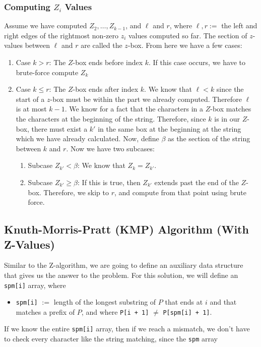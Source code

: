 \documentclass[10pt]{article}
\begin{document}
\subsubsection*{Computing $Z_i$ Values}
Assume we have computed $Z_2, \dots, Z_{k - 1}$, and $\ell$ and $r$, where $\ell, r :=$ the left and right edges of the rightmost non-zero $z_i$ values computed so far.  The section of $z$-values between $\ell$ and $r$ are called the $z$-box.  From here we have a few cases:
\begin{enumerate}
    \item Case $k > r$:  The $Z$-box ends before index $k$.  If this case occurs, we have to brute-force compute $Z_k$
    \item Case $k \leq r$:  The $Z$-box ends after index $k$.  We know that $\ell < k$ since the start of a $z$-box must be within the part we already computed.  Therefore $\ell$ is at most $k - 1$.  We know for a fact that the characters in a $Z$-box matches the characters at the beginning of the string.  Therefore, since $k$ is in our $Z$-box, there must exist a $k'$ in the same box at the beginning at the string which we have already calculated.  Now, define $\beta$ as the section of the string between $k$ and $r$.  Now we have two subcases:
    \begin{enumerate}
	    \item Subcase $Z_{k'} < \beta$:  We know that $Z_k = Z_{k'}$.
	    \item Subcase $Z_{k'} \geq \beta$:  If this is true, then $Z_{k'}$ extends past the end of the $Z$-box.  Therefore, we skip to $r$, and compute from that point using brute force.
    \end{enumerate}
\end{enumerate}

\subsection*{Knuth-Morris-Pratt (KMP) Algorithm (With Z-Values)}
Similar to the Z-algorithm, we are going to define an auxiliary data structure that gives us the answer to the problem.  For this solution, we will define an \texttt{spm[i]} array, where 
\begin{itemize}
    \item[] \texttt{spm[i]} $:=$ length of the longest substring of $P$ that ends at $i$ and that matches a prefix of $P$, and where \texttt{P[i + 1]} $\neq$ \texttt{P[spm[i] + 1]}.
\end{itemize}
If we know the entire \texttt{spm[i]} array, then if we reach a mismatch, we don't have to check every character like the string matching, since the \texttt{spm} array
\end{document}
